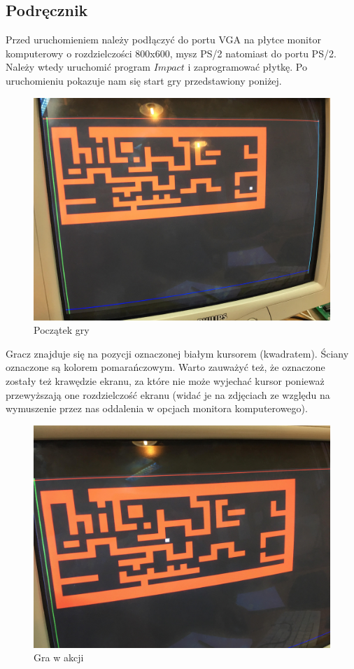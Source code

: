 \documentclass[a4paper]{article}
\begin{document}
\subsection{Podręcznik}

Przed uruchomieniem należy podłączyć do portu VGA na płytce monitor komputerowy o rozdzielczości 800x600, mysz PS/2 natomiast do portu PS/2. Należy wtedy uruchomić program $Impact$ i zaprogramować płytkę. Po uruchomieniu pokazuje nam się start gry przedstawiony poniżej.

\begin{figure}[H]
  \caption{Początek gry}
  \includegraphics[scale=0.05]{start}
  \centering
\end{figure}

Gracz znajduje się na pozycji oznaczonej białym kursorem (kwadratem). Ściany oznaczone są kolorem pomarańczowym. Warto zauważyć też, że oznaczone zostały też krawędzie ekranu, za które nie może wyjechać kursor ponieważ przewyższają one rozdzielczość ekranu (widać je na zdjęciach ze względu na wymuszenie przez nas  oddalenia w opcjach monitora komputerowego).

\begin{figure}[H]
  \caption{Gra w akcji}
  \includegraphics[scale=0.05]{gra1}
  \centering
\end{figure}
\end{document}
